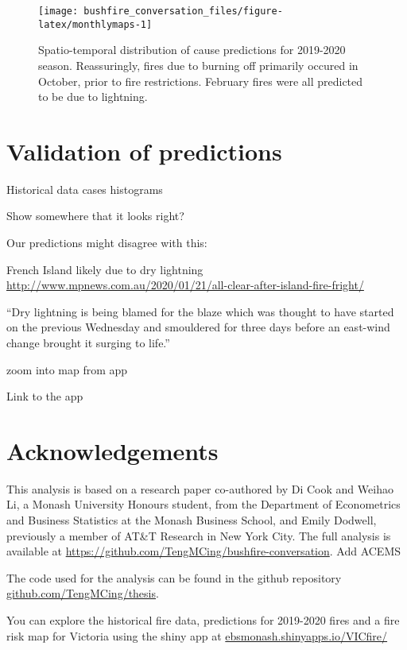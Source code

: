 \documentclass[
  11pt,
  a4paper,
]{article}
\begin{document}
\begin{figure}[H]

{\centering \texttt{[image: bushfire\_conversation\_files/figure-latex/monthlymaps-1]} 

}

\caption{Spatio-temporal distribution of cause predictions for 2019-2020 season. Reassuringly, fires due to burning off primarily occured in October, prior to fire restrictions. February fires were all predicted to be due to lightning.}\label{fig:monthlymaps}
\end{figure}

\hypertarget{validation-of-predictions}{%
\section*{Validation of predictions}\label{validation-of-predictions}}

Historical data cases histograms

Show somewhere that it looks right?

Our predictions might disagree with this:

French Island likely due to dry lightning
\url{http://www.mpnews.com.au/2020/01/21/all-clear-after-island-fire-fright/}

``Dry lightning is being blamed for the blaze which was thought to have started on the previous Wednesday and smouldered for three days before an east-wind change brought it surging to life.''

zoom into map from app

Link to the app

\hypertarget{acknowledgements}{%
\section{Acknowledgements}\label{acknowledgements}}

This analysis is based on a research paper co-authored by Di Cook and Weihao Li, a Monash University Honours student, from the Department of Econometrics and Business Statistics at the Monash Business School, and Emily Dodwell, previously a member of AT\&T Research in New York City. The full analysis is available at \url{https://github.com/TengMCing/bushfire-conversation}. Add ACEMS

The code used for the analysis can be found in the github repository \href{https://github.com/TengMCing/thesis}{github.com/TengMCing/thesis}.

You can explore the historical fire data, predictions for 2019-2020 fires and a fire risk map for Victoria using the shiny app at \href{https://ebsmonash.shinyapps.io/VICfire/}{ebsmonash.shinyapps.io/VICfire/}

\printbibliography
\end{document}
